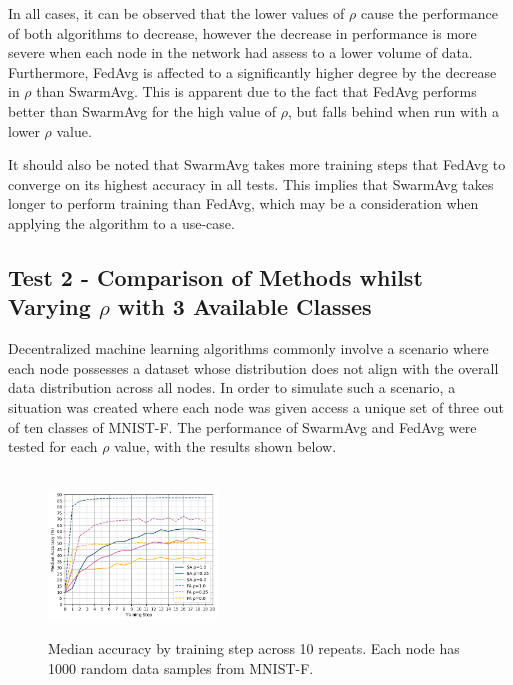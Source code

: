 \documentclass[letterpaper, 10 pt, conference]{ieeeconf}  %
\begin{document}
In all cases, it can be observed that the lower values of $\rho$ cause the performance of both algorithms to decrease, however the decrease in performance is more severe when each node in the network had assess to a lower volume of data. Furthermore, FedAvg is affected to a significantly higher degree by the decrease in $\rho$ than SwarmAvg. This is apparent due to the fact that FedAvg performs better than SwarmAvg for the high value of $\rho$, but falls behind when run with a lower $\rho$ value.

It should also be noted that SwarmAvg takes more training steps that FedAvg to converge on its highest accuracy in all tests. This implies that SwarmAvg takes longer to perform training than FedAvg, which may be a consideration when applying the algorithm to a use-case.

\subsection{Test 2 - Comparison of Methods whilst Varying $\rho$ with 3 Available Classes}
Decentralized machine learning algorithms commonly involve a scenario where each node possesses a dataset whose distribution does not align with the overall data distribution across all nodes. In order to simulate such a scenario, a situation was created where each node was given access a unique set of three out of ten classes of MNIST-F. The performance of SwarmAvg and FedAvg were tested for each $\rho$ value, with the results shown below.


\begin{figure}[H]
	 \\
	\includegraphics[width=0.4\textwidth]{conf_sparse_ns1000_cl3}
	\caption{Median accuracy by training step across 10 repeats. Each node has 1000 random data samples from MNIST-F.}
	\label{aeg7}
\end{figure}
\end{document}
